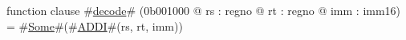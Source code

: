 function clause #\hyperref[zdecode]{decode}# (0b001000 @ rs : regno @ rt : regno @ imm : imm16) =
  #\hyperref[zSome]{Some}#(#\hyperref[zADDI]{ADDI}#(rs, rt, imm))
